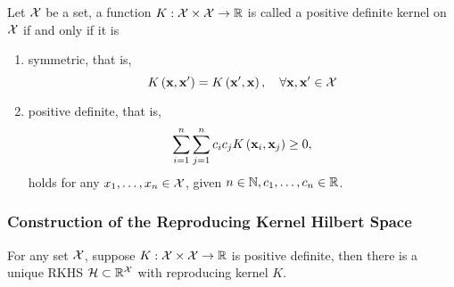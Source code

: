 \begin{definition}
	Let ${\mathcal X}$ be a set, a function $K:{\mathcal X}\times{\mathcal X}\rightarrow{\mathbb R}$ is called a positive definite kernel on ${\mathcal X}$ if and only if it is
	\begin{enumerate}
		\item symmetric, that is,
		      \begin{equation}
			      K\left({\bf x},{\bf x}^{\prime}\right)=K\left({\bf x}^{\prime},{\bf x}\right),\quad\forall{\bf x},{\bf x}^{\prime}\in{\mathcal X}
		      \end{equation}
		\item positive definite, that is,
		      \begin{equation}
			      \sum_{i=1}^{n}\sum_{j=1}^{n}c_{i}c_{j}K\left({\bf x}_{i},{\bf x}_{j}\right)\geq 0,
		      \end{equation}
		      holds for any $x_{1},\ldots,x_{n}\in{\mathcal X}$, given $n\in\mathbb{N},c_{1},\ldots,c_{n}\in{\mathbb R}$.
	\end{enumerate}
\end{definition}

\subsubsection{Construction of the Reproducing Kernel Hilbert Space}

\begin{theorem} \label{thm:morse-aronszajn}
	For any set ${\mathcal X}$, suppose $K:{\mathcal X}\times{\mathcal X}\rightarrow{\mathbb R}$ is positive definite, then there is a unique RKHS $\mathcal{H}\subset{\mathbb R}^{{\mathcal X}}$ with reproducing kernel $K$.
\end{theorem}

